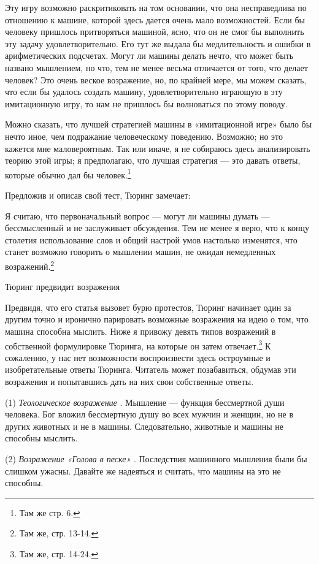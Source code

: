 \documentclass[../main.tex]{subfiles}
\begin{document}
Эту игру возможно раскритиковать на том основании, что она несправедлива по отношению к машине, которой здесь дается очень мало возможностей. Если бы человеку пришлось притворяться машиной, ясно, что он не смог бы выполнить эту задачу удовлетворительно. Его тут же выдала бы медлительность и ошибки в арифметических подсчетах. Могут ли машины делать нечто, что может быть названо мышлением, но что, тем не менее весьма отличается от того, что делает человек? Это очень веское возражение, но, по крайней мере, мы можем сказать, что если бы удалось создать машину, удовлетворительно играющую в эту имитационную игру, то нам не пришлось бы волноваться по этому поводу.

Можно сказать, что лучшей стратегией машины в «имитационной игре» было бы нечто иное, чем подражание человеческому поведению. Возможно; но это кажется мне маловероятным. Так или иначе, я не собираюсь здесь анализировать теорию этой игры; я предполагаю, что лучшая стратегия --- это давать ответы, которые обычно дал бы человек.\footnote{Там же стр. 6.}

Предложив и описав свой тест, Тюринг замечает:

Я считаю, что первоначальный вопрос --- могут ли машины думать --- бессмысленный и не заслуживает обсуждения. Тем не менее я верю, что к концу столетия использование слов и общий настрой умов настолько изменятся, что станет возможно говорить о мышлении машин, не ожидая немедленных возражений.\footnote{Там же, стр. 13-14.}

Тюринг предвидит возражения

Предвидя, что его статья вызовет бурю протестов, Тюринг начинает один за другим точно и иронично парировать возможные возражения на идею о том, что машина способна мыслить. Ниже я привожу девять типов возражений в собственной формулировке Тюринга, на которые он затем отвечает.\footnote{Там же, стр. 14-24.} К сожалению, у нас нет возможности воспроизвести здесь остроумные и изобретательные ответы Тюринга. Читатель может позабавиться, обдумав эти возражения и попытавшись дать на них свои собственные ответы.

(1) \emph{Теологическое возражение} . Мышление --- функция бессмертной души человека. Бог вложил бессмертную душу во всех мужчин и женщин, но не в других животных и не в машины. Следовательно, животные и машины не способны мыслить.

(2) \emph{Возражение «Голова в песке»} . Последствия машинного мышления были бы слишком ужасны. Давайте же надеяться и считать, что машины на это не способны.
\end{document}
